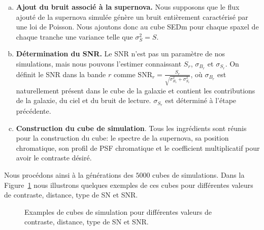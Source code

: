 \documentclass[../main/main.tex]{subfiles}
\begin{document}
\begin{enumerate}[(a)]
   \item \textbf{Ajout du bruit associé à la supernova.} Nous supposons que le
     flux ajouté de la supernova simulée génère un bruit entièrement caractérisé
     par une loi de Poisson. Nous ajoutons donc au cube SEDm pour chaque
     spaxel de chaque tranche une variance telle que
     $\sigma_{S}^{2}=S$.

   \item \textbf{Détermination du SNR.} Le SNR n'est pas un paramètre de
     nos simulations, mais nous pouvons l'estimer connaissant
     $S_{r}$, $\sigma_{B_{r}}$ et  $\sigma_{S_{r}}$. On définit le SNR
     dans la bande $r$ comme
     $\text{SNR}_{r}=\frac{S_{r}}{\sqrt{\sigma_{B_{r}}^{2}+\sigma_{S_{r}}^{2}}}$,
     où $\sigma_{B_{r}}$ est naturellement présent dans le cube de la
     galaxie et contient les contributions de la galaxie, du ciel et du
     bruit de lecture. $\sigma_{S_{r}}$ est déterminé à l'étape précédente.

   \item \textbf{Construction du cube de simulation}. Tous les
     ingrédients sont réunis pour la construction du cube: le spectre de
     la supernova, sa position chromatique, son profil de PSF
     chromatique et le coefficient multiplicatif pour avoir le contraste désiré.
  \end{enumerate}


Nous procédons ainsi à la générations des $5000$ cubes de
simulations. Dans la Figure~\ref{fig:examplesimu} nous illustrons
quelques exemples de ces cubes pour différentes valeurs de contraste,
distance, type de SN et SNR.
\begin{figure}[ht]
  \centering
  \caption[Examples de cubes de simulation.]{Examples de cubes de
    simulation pour différentes valeurs de contraste, distance, type de
    SN et SNR.}
  \label{fig:examplesimu}
\end{figure}
\end{document}
